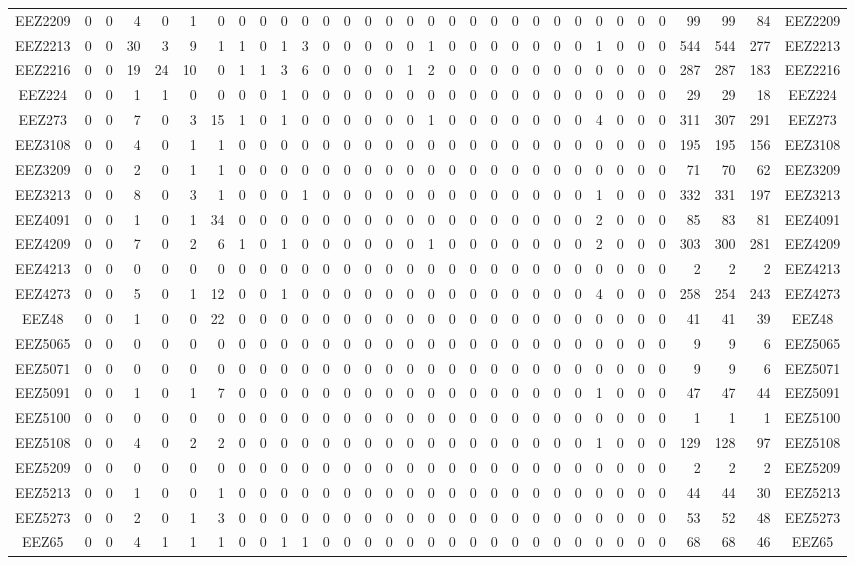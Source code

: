 \documentclass[10pt,a4paper,twoside]{report}
\begin{document}
{\begin{tabular}{crrrrrrrrrrrrrrrrrrrrrrrrrrrrrrc}
EEZ2209&0&0&4&0&1&0&0&0&0&0&0&0&0&0&0&0&0&0&0&0&0&0&0&0&0&0&0&99&99&84&EEZ2209\\
EEZ2213&0&0&30&3&9&1&1&0&1&3&0&0&0&0&0&1&0&0&0&0&0&0&0&1&0&0&0&544&544&277&EEZ2213\\
EEZ2216&0&0&19&24&10&0&1&1&3&6&0&0&0&0&1&2&0&0&0&0&0&0&0&0&0&0&0&287&287&183&EEZ2216\\
EEZ224&0&0&1&1&0&0&0&0&1&0&0&0&0&0&0&0&0&0&0&0&0&0&0&0&0&0&0&29&29&18&EEZ224\\
EEZ273&0&0&7&0&3&15&1&0&1&0&0&0&0&0&0&1&0&0&0&0&0&0&0&4&0&0&0&311&307&291&EEZ273\\
EEZ3108&0&0&4&0&1&1&0&0&0&0&0&0&0&0&0&0&0&0&0&0&0&0&0&0&0&0&0&195&195&156&EEZ3108\\
EEZ3209&0&0&2&0&1&1&0&0&0&0&0&0&0&0&0&0&0&0&0&0&0&0&0&0&0&0&0&71&70&62&EEZ3209\\
EEZ3213&0&0&8&0&3&1&0&0&0&1&0&0&0&0&0&0&0&0&0&0&0&0&0&1&0&0&0&332&331&197&EEZ3213\\
EEZ4091&0&0&1&0&1&34&0&0&0&0&0&0&0&0&0&0&0&0&0&0&0&0&0&2&0&0&0&85&83&81&EEZ4091\\
EEZ4209&0&0&7&0&2&6&1&0&1&0&0&0&0&0&0&1&0&0&0&0&0&0&0&2&0&0&0&303&300&281&EEZ4209\\
EEZ4213&0&0&0&0&0&0&0&0&0&0&0&0&0&0&0&0&0&0&0&0&0&0&0&0&0&0&0&2&2&2&EEZ4213\\
EEZ4273&0&0&5&0&1&12&0&0&1&0&0&0&0&0&0&0&0&0&0&0&0&0&0&4&0&0&0&258&254&243&EEZ4273\\
EEZ48&0&0&1&0&0&22&0&0&0&0&0&0&0&0&0&0&0&0&0&0&0&0&0&0&0&0&0&41&41&39&EEZ48\\
EEZ5065&0&0&0&0&0&0&0&0&0&0&0&0&0&0&0&0&0&0&0&0&0&0&0&0&0&0&0&9&9&6&EEZ5065\\
EEZ5071&0&0&0&0&0&0&0&0&0&0&0&0&0&0&0&0&0&0&0&0&0&0&0&0&0&0&0&9&9&6&EEZ5071\\
EEZ5091&0&0&1&0&1&7&0&0&0&0&0&0&0&0&0&0&0&0&0&0&0&0&0&1&0&0&0&47&47&44&EEZ5091\\
EEZ5100&0&0&0&0&0&0&0&0&0&0&0&0&0&0&0&0&0&0&0&0&0&0&0&0&0&0&0&1&1&1&EEZ5100\\
EEZ5108&0&0&4&0&2&2&0&0&0&0&0&0&0&0&0&0&0&0&0&0&0&0&0&1&0&0&0&129&128&97&EEZ5108\\
EEZ5209&0&0&0&0&0&0&0&0&0&0&0&0&0&0&0&0&0&0&0&0&0&0&0&0&0&0&0&2&2&2&EEZ5209\\
EEZ5213&0&0&1&0&0&1&0&0&0&0&0&0&0&0&0&0&0&0&0&0&0&0&0&0&0&0&0&44&44&30&EEZ5213\\
EEZ5273&0&0&2&0&1&3&0&0&0&0&0&0&0&0&0&0&0&0&0&0&0&0&0&0&0&0&0&53&52&48&EEZ5273\\
EEZ65&0&0&4&1&1&1&0&0&1&1&0&0&0&0&0&0&0&0&0&0&0&0&0&0&0&0&0&68&68&46&EEZ65\\

\end{tabular}}
\end{document}
